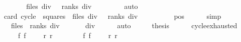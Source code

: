 \begin{isabellebody}
\isanewline
\ \ \isamarkupfalse%
\ \isamarkupfalse%
\ {\isachardoublequoteopen}{\isachardot}{\isachardot}{\isachardot}\ {\isacharequal}\ {\isacharbraceleft}{}{\isachardot}{\isachardot}{\isacharless}files\ div\ {}{\isacharbraceright}\ {\isasymtimes}\ {\isacharbraceleft}{}{\isachardot}{\isachardot}{\isacharless}ranks\ div\ {}{\isacharbraceright}\ {\isasymtimes}\ {\isacharbraceleft}{}{\isachardot}{\isachardot}{\isacharless}{}{\isacharbraceright}{\isachardoublequoteclose}\isanewline
\ \ \ \ \isamarkupfalse%
\ auto\isanewline
\ \ \isamarkupfalse%
\isanewline
\ \ \isamarkupfalse%
\ {\isachardoublequoteopen}card\ {\isacharparenleft}cycle\ {\isacharbackquote}\ squares{\isacharparenright}\ {\isacharequal}\ {\isacharparenleft}files\ div\ {}{\isacharparenright}\ {\isacharasterisk}\ {\isacharparenleft}ranks\ div\ {}{\isacharparenright}\ {\isacharasterisk}\ {}{\isachardoublequoteclose}\ \isanewline
\ \ \ \ \isamarkupfalse%
\ pos\isanewline
\ \ \ \ \isamarkupfalse%
\ simp\isanewline
\ \ \isamarkupfalse%
\ \isamarkupfalse%
\ {\isachardoublequoteopen}{\isachardot}{\isachardot}{\isachardot}\ {\isacharequal}\ {\isacharparenleft}files\ {\isacharasterisk}\ ranks{\isacharparenright}\ div\ {}{\isachardoublequoteclose}\isanewline
\ \ \ \ \isamarkupfalse%
\ div{}\isanewline
\ \ \ \ \isamarkupfalse%
\ auto\isanewline
\ \ \isamarkupfalse%
\ \isamarkupfalse%
\ {\isacharquery}thesis\isanewline
\ \ \ \ \isacommand{{\isachardot}}\isamarkupfalse%
\isanewline
{}\isamarkupfalse%
%
\endisatagproof
{\isafoldproof}%
%
\isadelimproof
\isanewline
%
\endisadelimproof
\isanewline
{}\isamarkupfalse%
\ cycle{}{\isacharunderscore}exhausted{\isacharcolon}\isanewline
\ \ \ {\isachardoublequoteopen}{}\ {\isasymle}\ f{}{\isachardoublequoteclose}\ {\isachardoublequoteopen}f{}\ {\isacharless}\ {}{\isachardoublequoteclose}\ {\isachardoublequoteopen}{}\ {\isasymle}\ r{}{\isachardoublequoteclose}\ {\isachardoublequoteopen}r{}\ {\isacharless}\ {}{\isachardoublequoteclose}\ \isanewline
\ \ \ {\isachardoublequoteopen}{}\ {\isasymle}\ f{}{\isachardoublequoteclose}\ {\isachardoublequoteopen}f{}\ {\isacharless}\ {}{\isachardoublequoteclose}\ {\isachardoublequoteopen}{}\ {\isasymle}\ r{}{\isachardoublequoteclose}\ {\isachardoublequoteopen}r{}\ {\isacharless}\ {}{\isachardoublequoteclose}\ \isanewline

\end{isabellebody}
